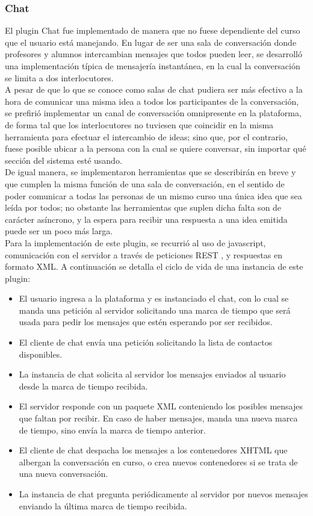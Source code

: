 \subsubsection{Chat}
El plugin Chat fue implementado de manera que no fuese dependiente del curso que el usuario está manejando. En lugar de ser una sala de conversación donde profesores y alumnos intercambian mensajes que todos pueden leer, se desarrolló una implementación típica de mensajería instantánea, en la cual la conversación se limita a dos interlocutores.\\

A pesar de que lo que se conoce como salas de chat pudiera ser más efectivo a la hora de comunicar una misma idea a todos los participantes de la conversación, se prefirió implementar un canal de conversación omnipresente en la plataforma, de forma tal que los interlocutores no tuviesen que coincidir en la misma herramienta para efectuar el intercambio de ideas; sino que, por el contrario, fuese posible ubicar a la persona con la cual se quiere conversar, sin importar qué sección del sistema esté usando.\\

De igual manera, se implementaron herramientas que se describirán en breve y que cumplen  la misma función de una sala de conversación, en el sentido de poder comunicar a todas las personas de un mismo curso una única idea que sea leída por todos; no obstante las herramientas que suplen dicha falta son de carácter asíncrono, y la espera para recibir una respuesta a una idea emitida puede ser un poco más larga.\\

Para la implementación de este plugin, se recurrió al uso de javascript, comunicación con el servidor a través de peticiones REST \citep{Fielding2000}, y respuestas en formato XML. A continuación se detalla el ciclo de vida de una instancia de este plugin:

\begin{itemize}
	\item El usuario ingresa a la plataforma y es instanciado  el chat, con lo cual se manda una petición al servidor solicitando una marca de tiempo que será usada para pedir los mensajes que estén esperando por ser recibidos.
	\item El cliente de chat envía una petición solicitando la lista de contactos disponibles.
	\item La instancia de chat solicita al servidor los mensajes enviados al usuario desde la marca de tiempo recibida.
	\item El servidor responde con un paquete XML conteniendo los posibles mensajes que faltan por recibir. En caso de haber mensajes, manda una nueva marca de tiempo, sino envía la marca de tiempo anterior.
	\item El cliente de chat despacha los mensajes a los contenedores XHTML que albergan la conversación en curso, o crea nuevos contenedores si se trata de una nueva conversación.
	\item La instancia de chat pregunta periódicamente al servidor por nuevos mensajes enviando la última marca de tiempo recibida.
\end{itemize}

